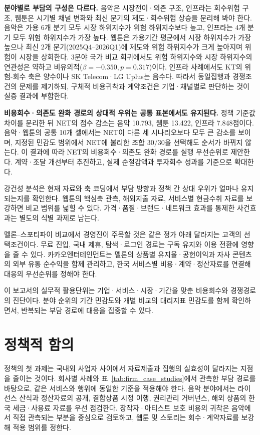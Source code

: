\documentclass[11pt,a4paper]{report}
\begin{document}
\textbf{분야별로 부담의 구성은 다르다.} 음악은 시장전이·의존 구조, 인프라는 회수위험 구조, 웹툰은 시기별 채널 변화와 최신 분기의 제도·회수위험 상승을 분리해 봐야 한다. 음악은 가용 6개 분기 모두 시장 하위지수가 위험 하위지수보다 높고, 인프라는 4개 분기 모두 위험 하위지수가 가장 높다. 웹툰은 가용기간 평균에서 시장 하위지수가 가장 높으나 최신 2개 분기(2025Q4--2026Q1)에 제도와 위험 하위지수가 크게 높아지며 위험이 시장을 상회한다. 3분야 국가 비교 회귀에서도 위험 하위지수와 시장 하위지수의 연관성은 약하고 비유의적($\beta=-0.350, p=0.317$)이다. 인프라 사례에서도 KT의 위험-회수 축은 양수이나 SK Telecom·LG Uplus는 음수다. 따라서 동일집행과 경쟁조건의 문제를 제기하되, 구체적 비용귀착과 계약조건은 기업·채널별로 판단하는 것이 실증 결과에 부합한다.

\textbf{비용회수·의존도 완화 경로의 상대적 우위는 공통 표본에서도 유지된다.} 정책 기준값 차이를 분리한 뒤 NET의 점수 감소는 음악 10.793, 웹툰 13.422, 인프라 7.848점이다. 음악·웹툰의 공통 10개 셀에서는 NET이 다른 세 시나리오보다 모두 큰 감소를 보이며, 지정된 민감도 범위에서 NET에 불리한 조합 30/30을 선택해도 순서가 바뀌지 않는다. 이 결과에 따라 NET의 비용회수·의존도 완화 경로를 실행 우선순위로 제안한다. 계약·조달 개선부터 추진하고, 실제 순절감액과 투자회수 성과를 기준으로 확대한다.

강건성 분석은 현재 자료와 축 코딩에서 부담 방향과 정책 간 상대 우위가 얼마나 유지되는지를 확인한다. 웹툰의 핵심축 관측, 해외지출 자료, 서비스별 현금수취 자료를 보강하면 비교 범위를 넓힐 수 있다. 가격·품질·브랜드·네트워크 효과를 통제한 사건효과는 별도의 식별 과제로 남는다.



멜론--스포티파이 비교에서 경영진이 주목할 것은 같은 정가 아래 달라지는 고객의 선택조건이다. 무료 진입, 국내 제휴, 탐색·로그인 경로는 구독 유지와 이용 전환에 영향을 줄 수 있다. 카카오엔터테인먼트는 멜론의 상품별 유지율·공헌이익과 자사 콘텐츠의 외부 유통 순수익을 함께 관리하고, 한국 서비스별 비용·계약·정산자료를 연결해 대응의 우선순위를 정해야 한다.

이 보고서의 실무적 활용단위는 기업·서비스·시장·기간을 맞춘 비용회수와 경쟁경로의 진단이다. 분야 순위의 기간 민감도와 개별 비교의 대리지표 민감도를 함께 확인하면서, 반복되는 부담 경로에 대응을 집중할 수 있다.

\section{정책적 함의}
정책의 첫 과제는 국내외 사업자 사이에서 자료제출과 집행의 실효성이 달라지는 지점을 줄이는 것이다. 회사별 사례와 표~\ref{tab:firm_case_studies}에서 관측한 부담 경로를 바탕으로, 같은 서비스와 행위에 동일한 기준을 적용해야 한다. 음악 분야에서는 라이선스 산식과 정산자료의 공개, 결합상품 시정 이행, 권리관리 거버넌스, 해외 상품의 한국 세금·사용료 자료를 우선 점검한다. 창작자·아티스트 보호 비용의 귀착은 음악에서 직접 관측되는 부분을 중심으로 검토하고, 웹툰 및 스토리는 회수·계약자료를 보강해 적용 범위를 정한다.
\end{document}
